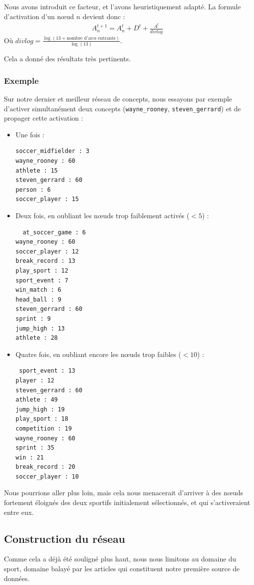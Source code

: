 \documentclass[a4paper, 12pt]{article}
\begin{document}
Nous avons introduit ce facteur, et l'avons heuristiquement adapté. La formule d'activation d'un n\oe{}ud $n$ devient donc :
\begin{align}
 A_n^{t+1} = A_n^t + D^t + \frac{A^t}{divlog}
\end{align}
Où $divlog = \frac{\log(13 + \text{nombre d'arcs entrants})}{\log(13)}$.

Cela a donné des résultats très pertinents.

\subsubsection{Exemple}

Sur notre dernier et meilleur réseau de concepts, nous essayons par exemple d'activer simultanément deux concepts (\verb|wayne_rooney|, \verb|steven_gerrard|) et de propager cette activation :
\begin{itemize}
 \item Une fois :
 \begin{verbatim}
soccer_midfielder : 3
wayne_rooney : 60
athlete : 15
steven_gerrard : 60
person : 6
soccer_player : 15
 \end{verbatim}
 \item Deux fois, en oubliant les n\oe{}uds trop faiblement activés ($ < 5$) :
 \begin{verbatim}
  at_soccer_game : 6
wayne_rooney : 60
soccer_player : 12
break_record : 13
play_sport : 12
sport_event : 7
win_match : 6
head_ball : 9
steven_gerrard : 60
sprint : 9
jump_high : 13
athlete : 28
 \end{verbatim}
\item Quatre fois, en oubliant encore les n\oe{}uds trop faibles ($ < 10$) :
\begin{verbatim}
 sport_event : 13
player : 12
steven_gerrard : 60
athlete : 49
jump_high : 19
play_sport : 18
competition : 19
wayne_rooney : 60
sprint : 35
win : 21
break_record : 20
soccer_player : 10
\end{verbatim}
\end{itemize}
Nous pourrions aller plus loin, mais cela nous menacerait d'arriver à des n\oe{}uds fortement éloignés des deux sportifs initialement sélectionnés, et qui s'activeraient entre eux.


\subsection{Construction du réseau}
Comme cela a déjà été souligné plus haut, nous nous limitons au domaine du sport, domaine balayé par les articles qui constituent notre première source de données. 
\end{document}
